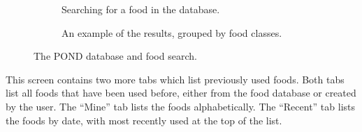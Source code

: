 \begin{figure}	
\centering
	\begin{subfigure}[t]{1.25in}
		\centering
		\setlength\fboxsep{0pt}
\setlength\fboxrule{0.5pt}
		\caption{Searching for a food in the database. }\label{fig:pond_mine_tab}
	\end{subfigure}
\quad
\begin{subfigure}[t]{1.25in}
		\centering
		\setlength\fboxsep{0pt}
\setlength\fboxrule{0.5pt}
		\caption{An example of the results, grouped by food classes.}\label{fig:pond_recents_tab}
	\end{subfigure}
	\caption{The POND database and food search. }\label{fig:pond_foods_lists}
\end{figure}
This screen contains two more tabs which list previously used foods. Both tabs list all foods that have been used before, either from the food database or created by the user. The ``Mine'' tab lists the foods alphabetically. The ``Recent'' tab lists the foods by date, with most recently used at the top of the list. 
 


